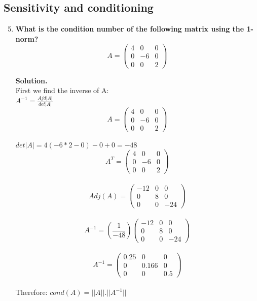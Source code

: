 \documentclass[12pt, oneside]{article}   	%
\begin{document}
\subsection*{Sensitivity and conditioning}
\begin{enumerate}
\setcounter{enumi}{4}
\item \textbf{What is the condition number of the following matrix using the 1-norm?}
$$
A = \left(\begin{array}{ccc} 4 & 0 & 0 \\ 0 & -6 & 0 \\ 0& 0 & 2 \end{array} \right)
$$

\textbf{Solution.}\\

First we find the inverse of A:\\
$A^{-1}=\frac{Ajd|A|}{det|A|}$\\
$$
A = \left(\begin{array}{ccc} 4 & 0 & 0 \\ 0 & -6 & 0 \\ 0& 0 & 2 \end{array} \right)
$$\\
$det|A|= 4(-6*2-0)-0+0=-48$\\
$$
A^T = \left(\begin{array}{ccc} 4 & 0 & 0 \\ 0 & -6 & 0 \\ 0& 0 & 2 \end{array} \right)
$$\\
$$
Adj(A)= \left(\begin{array}{ccc} -12 & 0 & 0 \\ 0 & 8 & 0 \\ 0& 0 & -24 \end{array} \right)
$$\\
$$
A^{-1}= (\frac{1}{-48})\left(\begin{array}{ccc} -12 & 0 & 0 \\ 0 & 8 & 0 \\ 0& 0 & -24 \end{array} \right)
$$\\
 $$
A^{-1}= \left(\begin{array}{ccc} 0.25 & 0 & 0 \\ 0 & 0.166& 0 \\ 0& 0 & 0.5\end{array} \right)
$$\\
Therefore: $cond(A)=||A||. ||A^{-1}||$\\


\end{enumerate}
\end{document}
